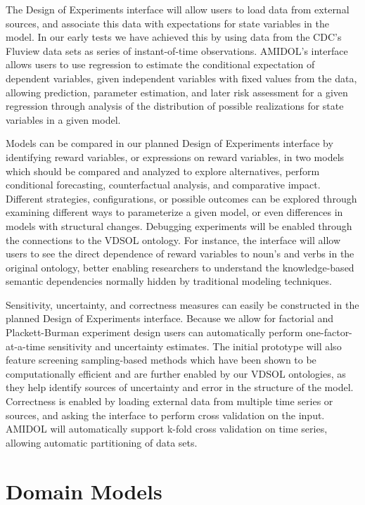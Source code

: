 \documentclass[11pt]{article}
\newcommand{\amidol}{\textsc{AMIDOL}}
\begin{document}
The Design of Experiments interface will allow users to load data from external sources, and associate this data with expectations for state variables in the model.  In our early tests we have achieved this by using data from the CDC's Fluview \cite{cdc2019fluview} data sets as series of instant-of-time observations.  \amidol{}'s interface allows users to use regression to estimate the conditional expectation of dependent variables, given independent variables with fixed values from the data, allowing prediction, parameter estimation, and later risk assessment for a given regression through analysis of the distribution of possible realizations for state variables in a given model.

Models can be compared in our planned Design of Experiments interface by identifying reward variables, or expressions on reward variables, in two models which should be compared and analyzed to explore alternatives, perform conditional forecasting, counterfactual analysis, and comparative impact.  Different strategies, configurations, or possible outcomes can be explored through examining different ways to parameterize a given model, or even differences in models with structural changes.  Debugging experiments will be enabled through the connections to the VDSOL ontology.  For instance, the interface will allow users to see the direct dependence of reward variables to noun's and verbs in the original ontology, better enabling researchers to understand the knowledge-based semantic dependencies normally hidden by traditional modeling techniques.

Sensitivity, uncertainty, and correctness measures can easily be constructed in the planned Design of Experiments interface.  Because we allow for factorial and Plackett-Burman experiment design users can automatically perform one-factor-at-a-time \cite{bailis2005mortality,murphy2004quantification} sensitivity and uncertainty estimates.  The initial prototype will also feature screening sampling-based methods \cite{morris1991factorial} which have been shown to be computationally efficient and are further enabled by our VDSOL ontologies, as they help identify sources of uncertainty and error in the structure of the model.  Correctness is enabled by loading external data from multiple time series or sources, and asking the interface to perform cross validation on the input.  \amidol{} will automatically support k-fold cross validation on time series, allowing automatic partitioning of data sets.

\section{Domain Models}
\end{document}

